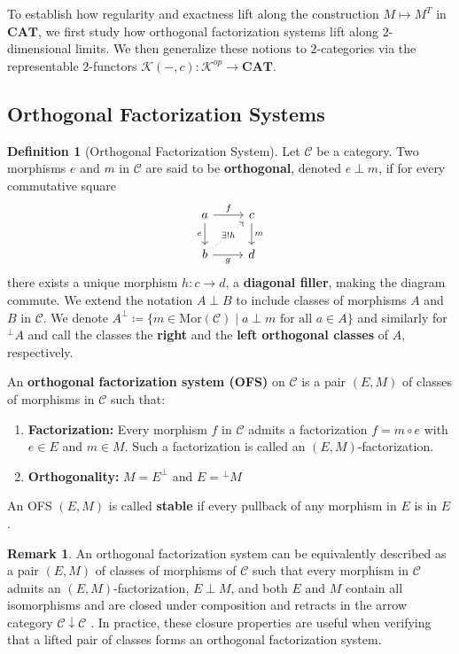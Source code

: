 \documentclass[11pt]{article}
\theoremstyle{plain}
\theoremstyle{definition}
\newtheorem{definition}[theorem]{Definition}
\newtheorem{remark}[theorem]{Remark}
\numberwithin{equation}{section}
\newcommand{\C}{\mathcal{C}}
\newcommand{\K}{\mathcal{K}}
\newcommand{\Mor}{\mathrm{Mor}}
\newcommand{\CAT}{\mathbf{CAT}}
\begin{document}
To establish how regularity and exactness lift along the construction $M\mapsto M^T$ in $\CAT$, we first study how orthogonal factorization systems lift along $2$-dimensional limits. We then generalize these notions to $2$-categories via the representable $2$-functors $\K(-,c)\colon \K^{op}\to \CAT$.

\subsection{Orthogonal Factorization Systems}
\begin{definition}[Orthogonal Factorization System]\label{def:1cat_ofs}
   Let $\C$ be a category. Two morphisms $e$ and $m$ in $\C$ are said to be \textbf{orthogonal}, denoted $e \perp m$, if for every commutative square 
   $$
\begin{tikzcd}
a \arrow[d, "e"'] \arrow[r, "f"]                              & c \arrow[d, "m"] \\
b \arrow[r, "g"'] \arrow[ru, "\exists!h" description, dotted] & d               
\end{tikzcd}
   $$ there exists a unique morphism $h\colon c\to d$, a \textbf{diagonal filler}, making the diagram commute. We extend the notation $A\perp B$ to include classes of morphisms $A$ and $B$ in $\C$. We denote $A^\perp\coloneqq \{m\in \Mor(\C)\mid a\perp m\text{ for all $a\in A$}\}$ and similarly for $^\perp\! A$ and call the classes the \textbf{right} and the \textbf{left orthogonal classes} of $A$, respectively.
   
   An \textbf{orthogonal factorization system (OFS)} on $\C$ is a pair $(E, M)$ of classes of morphisms in $\C$ such that:
   \begin{enumerate}
       \item \textbf{Factorization:} Every morphism $f$ in $\C$ admits a factorization $f = m \circ e$ with $e \in E$ and $m \in M$. Such a factorization is called an $(E,M)$-factorization.
       \item \textbf{Orthogonality:} $M = E^\perp$ and $E =\! ^\perp\! M$
   \end{enumerate}
   An OFS $(E,M)$ is called \textbf{stable} if every pullback of any morphism in $E$ is in $E$. 
\end{definition}

\begin{remark}
   An orthogonal factorization system can be equivalently described as a pair $(E, M)$ of classes of morphisms of $\C$ such that every morphism in $\C$ admits an $(E, M)$-factorization, $E \perp M$, and both $E$ and $M$ contain all isomorphisms and are closed under composition and retracts in the arrow category $\C\downarrow \C$ \cite[Lemma 11.2.3]{Riehl2014CategoricalHomotopyTheory}. In practice, these closure properties are useful when verifying that a lifted pair of classes forms an orthogonal factorization system. 
\end{remark}
\end{document}

